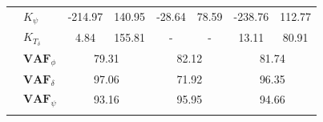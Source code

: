 \begin{table}[]
\begin{tabular}{llcccccc}
                                                   & $K_\psi $                                              & -214.97                                     & 140.95                                               & -28.64                                      & 78.59                                                & -238.76                                     & 112.77                                               \\
                                                   & $K_{T_\delta}$                                         & 4.84                                        & 155.81                                               & -                                           & -                                                    & 13.11                                       & 80.91                                                \\ \cline{2-8} 
                                                   & $\mathbf{VAF}_\phi$                                    & \multicolumn{2}{c}{79.31}                                                                          & \multicolumn{2}{c}{82.12}                                                                          & \multicolumn{2}{c}{81.74}                                                                          \\
                                                   & $\mathbf{VAF}_\delta$                                  & \multicolumn{2}{c}{97.06}                                                                          & \multicolumn{2}{c}{71.92}                                                                          & \multicolumn{2}{c}{96.35}                                                                          \\
                                                   & $\mathbf{VAF}_\psi$                                    & \multicolumn{2}{c}{93.16}                                                                          & \multicolumn{2}{c}{95.95}                                                                          & \multicolumn{2}{c}{94.66}                                                                          \\
                                                   &                                                        & \multicolumn{1}{l}{}                        & \multicolumn{1}{l}{}                                 & \multicolumn{1}{l}{}                        & \multicolumn{1}{l}{}                                 & \multicolumn{1}{l}{}                        & \multicolumn{1}{l}{}                                 \\ \hline

\end{tabular}
\end{table}
